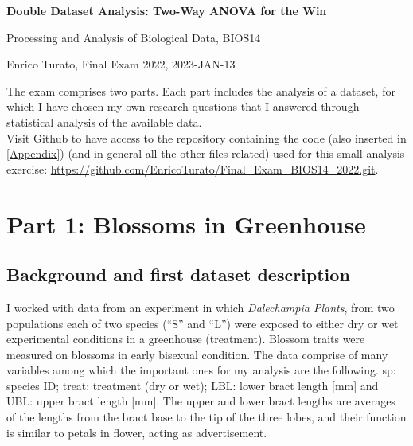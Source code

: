 \documentclass{article}
\begin{document}
        \Large
        \begin{center}
        \textbf{Double Dataset Analysis: Two-Way ANOVA for the Win}
               
        \Large
        Processing and Analysis of Biological Data, BIOS14
        
        \large
        Enrico Turato, Final Exam 2022, 2023-JAN-13
        \end{center} 
The exam comprises two parts. Each part includes the 
analysis of a dataset, for which I have chosen my own research questions that I answered through statistical analysis of the available data.\\ 
Visit Github to have access to the repository containing the code (also inserted in \autoref{Appendix}) (and in general all the other files related) used for this small analysis exercise: \url{https://github.com/EnricoTurato/Final_Exam_BIOS14_2022.git}.
%
\section{Part 1: Blossoms in Greenhouse}

\subsection{Background and first dataset description}

I worked with data from an experiment in which \emph{Dalechampia Plants}, from two populations each of two species (“S” and “L”) were exposed to either dry or wet experimental conditions in a greenhouse (treatment). Blossom traits were measured on blossoms in early bisexual condition. The data comprise of many variables among which the important ones for my analysis are the following.
sp: species ID; treat: treatment (dry or wet); LBL: lower bract length [mm] and  UBL: upper bract length [mm]. The upper and lower bract lengths are averages of the lengths from the bract base to the tip of the three lobes, and their function is similar to petals in flower, acting as advertisement.
\end{document}
